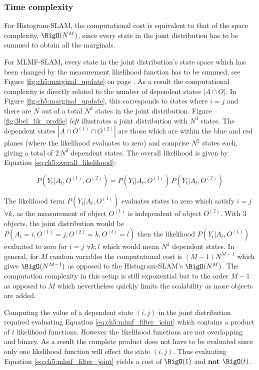 \subsubsection{Time complexity}

For Histogram-SLAM, the computational cost is equivalent to that of the space complexity, $\BigO(N^M)$,
since every state in the joint distribution has to be summed to obtain all the marginals.

For MLMF-SLAM, every state in the joint distribution's state space which has been changed by the measurement likelihood function 
has to be summed, see Figure \ref{fig:ch5:marginal_update} on page \pageref{fig:ch5:marginal_update}. As a result the computational complexity is directly related to the number 
of dependent states $|A \cap O|$. In Figure \ref{fig:ch5:marginal_update}, this corresponds to states where $i = j$ and there are $N$ out of a total $N^2$ states
in the joint distribution. Figure \ref{fig:3bel_lik_profile} \textit{left}
illustrates a joint distribution with $N^3$ states. The dependent states $|A \cap O^{(1)} \cap O^{(2)}|$ are those which 
are within the blue and red planes (where the likelihood evaluates to zero) and comprise $N^2$ states each, 
giving a total of $2\,N^2$ dependent states. The overall likelihood is given by 
Equation \ref{eq:ch5:overall_likelihood}:

\begin{equation}
 P(Y_t|A_t,O^{(1)},O^{(2)}) = P(Y_t|A_t,O^{(1)})\, P(Y_t|A_t,O^{(2)}) \label{eq:ch5:overall_likelihood}
\end{equation}

The likelihood term $P(Y_t|A_t,O^{(1)})$ evaluates states to zero which satisfy $i=j$ $\forall k$, as 
the measurement of object $O^{(1)}$ is independent of object $O^{(2)}$. With 3 objects, the joint distribution would be
$P(A_t=i,O^{(1)}=j,O^{(2)}=k,O^{(l)}=l)$ then the likelihood $P(Y_t|A_t,O^{(1)})$  evaluated to 
zero for $i=j$ $\forall k,l$ which would mean $N^3$ dependent states.
In general, for $M$ random variables the computational cost is $(M-1) N^{M-1}$ which gives $\BigO(N^{M-1})$ as opposed to the Histogram-SLAM's $\BigO(N^M)$. 
The computation complexity in this setup is still exponential but to the order $M-1$ as opposed to $M$ which nevertheless 
quickly limits the scalability as more objects are added. 

Computing the value of a dependent state $(i,j)$ in the joint distribution required evaluating Equation \ref{eq:ch5:mlmf_filter_joint} which
contains a product of $t$ likelihood functions. However the likelihood functions are not overlapping and binary. As a result the complete product
does not have to be evaluated since only one likelihood function will effect the state $(i,j)$. Thus evaluating Equation \ref{eq:ch5:mlmf_filter_joint}
yields a cost of $\BigO(1)$ and \textbf{not} $\BigO(t)$.

